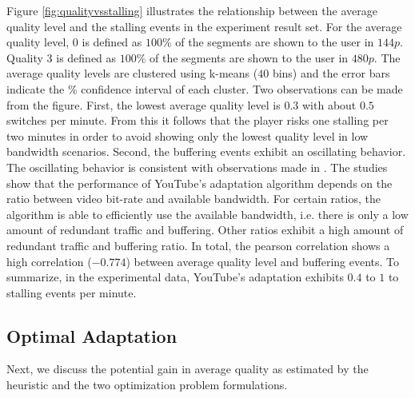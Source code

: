 Figure \ref{fig:qualityvsstalling} illustrates the relationship between the average quality level and the stalling events in the experiment result set.
For the average quality level, $0$ is defined as $100\%$ of the segments are shown to the user in $144p$. Quality $3$ is defined as $100\%$ of the segments are shown to the user in $480p$.
The average quality levels are clustered using k-means ($40$ bins) and the error bars indicate the \unit[95]{\%} confidence interval of each cluster.
Two observations can be made from the figure. 
First, the lowest average quality level is $0.3$ with about $0.5$ switches per minute.
From this it follows that the player risks one stalling per two minutes in order to avoid showing only the lowest quality level in low bandwidth scenarios.
Second, the buffering events exhibit an oscillating behavior.
The oscillating behavior is consistent with observations made in \cite{sieber16sacrificing, casas2012youtube}.
The studies show that the performance of YouTube's adaptation algorithm depends on the ratio between video bit-rate and available bandwidth.
For certain ratios, the algorithm is able to efficiently use the available bandwidth, i.e. there is only a low amount of redundant traffic and buffering.
Other ratios exhibit a high amount of redundant traffic and buffering ratio.
In total, the pearson correlation shows a high correlation ($-0.774$) between average quality level and buffering events.
To summarize, in the experimental data, YouTube's adaptation exhibits $0.4$ to $1$ to stalling events per minute.

\subsection{Optimal Adaptation}

Next, we discuss the potential gain in average quality as estimated by the heuristic and the two optimization problem formulations. 

